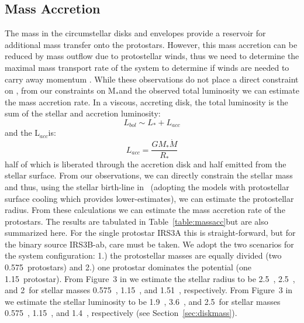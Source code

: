 \subsection{Mass Accretion}\label{sec:massacc}
The mass in the circumstellar disks and envelopes provide a reservoir for additional mass transfer onto the protostars. However, this mass accretion can be reduced by mass outflow due to protostellar winds, thus we need to determine the maximal mass transport rate of the system to determine if winds are needed to carry away momentum \citep{1998ApJ...502..661W}. While these observations do not place a direct constraint on \mdot, from our constraints on M$_{*}$\space and the observed total luminosity we can estimate the mass accretion rate. In a viscous, accreting disk, the total luminosity is the sum of the stellar and accretion luminosity:
\begin{equation}
L_{bol}\sim L_{*}+L_{acc}
\end{equation}
and the L$_{acc}$\space is:
\begin{equation}
L_{acc}=\frac{GM_{*}\dot{M}}{R_{*}}
\end{equation}
half of which is liberated through the accretion disk and half emitted from the stellar surface. From our observations, we can directly constrain the stellar mass and thus, using the stellar birth-line in \citet{1997ApJ...475..770H}~(adopting the models with protostellar surface cooling which provides lower-estimates), we can estimate the protostellar radius. From these calculations we can estimate the mass accretion rate of the protostars. The results are tabulated in Table~\ref{table:massacc}\space but are also summarized here. For the single protostar IRS3A this is straight-forward, but for the binary source IRS3B-ab, care must be taken. We adopt the two scenarios for the system configuration: 1.) the protostellar masses are equally divided (two 0.575~\solm\space protostars) and 2.) one protostar dominates the potential (one 1.15~\solm\space protostar). From Figure~3 in \citet{1997ApJ...475..770H}\space we estimate the stellar radius to be 2.5~\rsun, 2.5~\rsun, and 2~\rsun\space for stellar masses 0.575~\solm, 1.15~\solm, and 1.51~\solm, respectively. From Figure~3 in \citet{1997ApJ...475..770H}\space we estimate the stellar luminosity to be 1.9~\lsun, 3.6~\lsun, and 2.5~\lsun\space for stellar masses 0.575~\solm, 1.15~\solm, and 1.4~\solm, respectively (see Section~\ref{sec:diskmass}).


